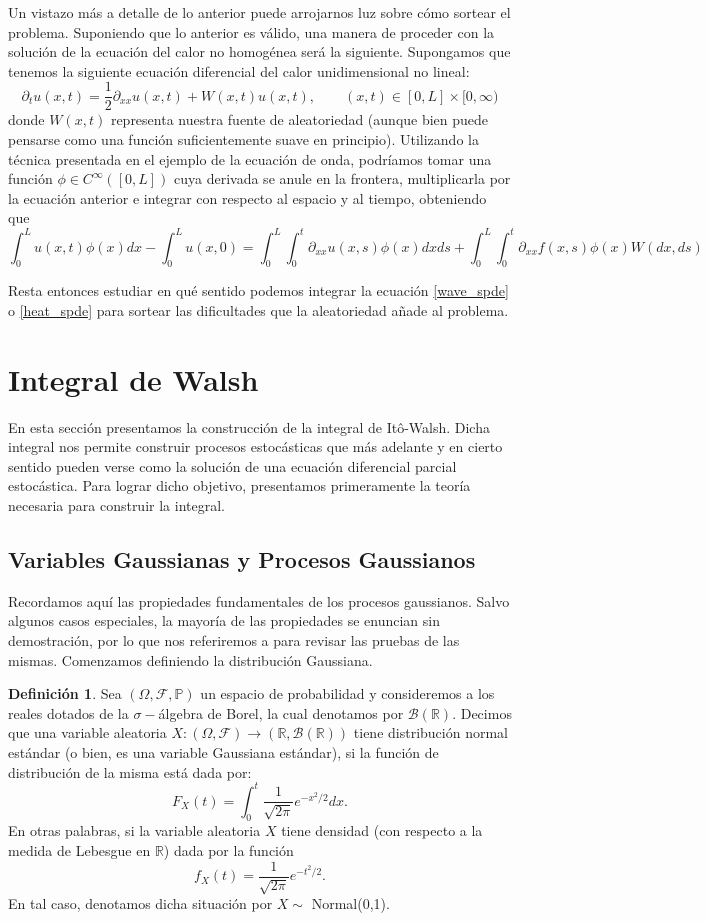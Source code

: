 \documentclass[letterpaper,twoside]{book}
\newcommand{\R}{\mathbb{R}}
\newcommand{\F}{\mathcal{F}}
\newcommand{\B}{\mathcal{B}}
\renewcommand{\P}{\mathbb{P}}
\newcommand{\1}{\mathds{1}}
\renewcommand{\to}{\rightarrow}
\theoremstyle{definition}
\newtheorem{dfn}{Definición}
\theoremstyle{definition}
\theoremstyle{definition}
\theoremstyle{definition}
\theoremstyle{definition}
\theoremstyle{definition}
\theoremstyle{definition}
\begin{document}
Un vistazo más a detalle de lo anterior puede arrojarnos luz sobre cómo sortear el problema. Suponiendo que lo anterior es válido, una manera de proceder con la solución de la ecuación del calor no homogénea será la siguiente. Supongamos que tenemos la siguiente ecuación diferencial del calor unidimensional no lineal:
\[
\partial_tu(x,t)=\frac{1}{2}\partial_{xx}u(x,t)+W(x,t)u(x,t), \qquad (x,t)\in [0,L]\times [0,\infty) 
\]
donde $W(x,t)$ representa nuestra fuente de aleatoriedad (aunque bien puede pensarse como una función suficientemente suave en principio). Utilizando la técnica presentada en el ejemplo de la ecuación de onda, podríamos tomar una función $\phi \in C^{\infty}([0,L])$ cuya derivada se anule en la frontera, multiplicarla por la ecuación anterior e integrar con respecto al espacio y al tiempo, obteniendo que 
\[
\int_{0}^{L}u(x,t)\phi(x)dx-\int_{0}^{L}u(x,0)=\int_{0}^{L}\int_{0}^{t}\partial_{xx}u(x,s)\phi(x)dx ds+\int_{0}^{L}\int_{0}^{t}\partial_{xx}f(x,s)\phi(x)W(dx,ds)
\]
 
Resta entonces estudiar en qué sentido podemos integrar la ecuación \eqref{wave_spde} o \eqref{heat_spde} para sortear las dificultades que la aleatoriedad añade al problema.

\section{Integral de Walsh}
En esta sección presentamos la construcción de la integral de Itô-Walsh. Dicha integral nos permite construir procesos estocásticas que más adelante y en cierto sentido pueden verse como la solución de una ecuación diferencial parcial estocástica. Para lograr dicho objetivo, presentamos primeramente la teoría necesaria para construir la integral.
\subsection{Variables Gaussianas y Procesos Gaussianos}
Recordamos aquí las propiedades fundamentales de los procesos gaussianos. Salvo algunos casos especiales, la mayoría de las propiedades se enuncian sin demostración, por lo que nos referiremos a \cite{LeGall2016} para revisar las pruebas de las mismas. Comenzamos definiendo la distribución Gaussiana.

\begin{dfn}
Sea $(\Omega, \F, \P)$ un espacio de probabilidad y consideremos a los reales dotados de la $\sigma-$álgebra de Borel, la cual denotamos por $\B(\R)$. Decimos que una variable aleatoria $X:(\Omega, \F)\to (\R,\B(\R))$ tiene distribución normal estándar (o bien, es una variable Gaussiana estándar), si la función de distribución de la misma está dada por: 
\[
F_X(t)=\int_{0}^{t}\frac{1}{\sqrt{2\pi}}e^{-x^2/2}dx.    
\]
En otras palabras, si la variable aleatoria $X$ tiene densidad (con respecto a la medida de Lebesgue en $\R$) dada por la función 
\[
f_X(t)=\frac{1}{\sqrt{2\pi}}e^{-t^2/2}.
\]
En tal caso, denotamos dicha situación por $X\sim$ Normal(0,1).
\end{dfn}
\end{document}
